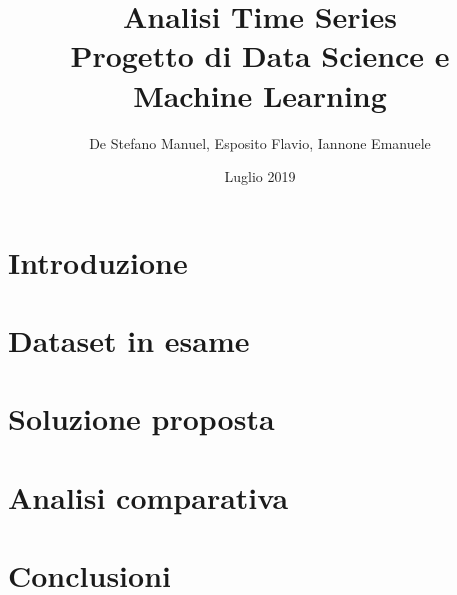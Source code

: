 \documentclass[12pt]{report}
\title{
	Analisi Time Series\\
	\large Progetto di Data Science e Machine Learning
}
\author{De Stefano Manuel, Esposito Flavio, Iannone Emanuele}
\date{Luglio 2019}
\begin{document}
\maketitle
\tableofcontents

\chapter{Introduzione} \label{chap:intro}


\chapter{Dataset in esame} \label{chap:dataset}


\chapter{Soluzione proposta} \label{chap:solution}


\chapter{Analisi comparativa} \label{chap:comparison}


\chapter{Conclusioni} \label{chap:conclusioni}


\printbibliography
\end{document}
